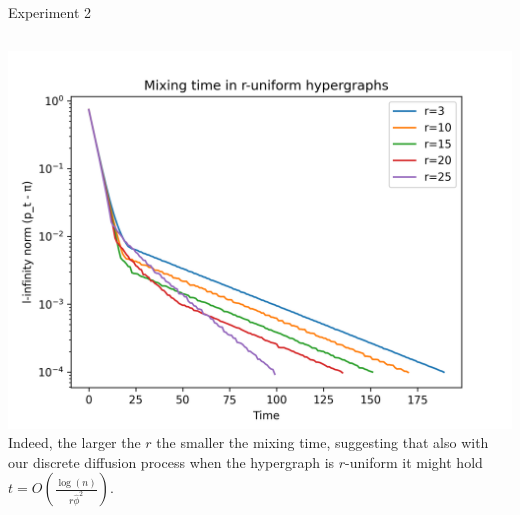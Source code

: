 \documentclass[../main.tex]{subfiles}
\begin{document}
	\begin{frame}{Experiment 2}
		\begin{columns}
			\includegraphics[width=1\textwidth]{Figures/mixing_r_uniform_hypergraph}  
			Indeed, the larger the $r$ the smaller the mixing time, suggesting that also with our discrete diffusion process when the hypergraph is $r$-uniform it might hold $t=O\left(\frac{\log(n)}{r\hat{\phi}^2}\right)$.
		\end{columns}
	\end{frame}
\end{document}

